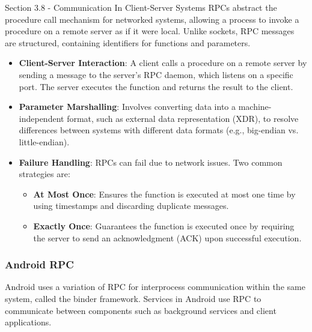 \begin{notes}{Section 3.8 - Communication In Client-Server Systems}
    RPCs abstract the procedure call mechanism for networked systems, allowing a process to invoke a procedure on a remote server as if it were local. Unlike sockets, RPC messages are structured, 
    containing identifiers for functions and parameters.
    
    \begin{highlight}
    
        \begin{itemize}
            \item \textbf{Client-Server Interaction}: A client calls a procedure on a remote server by sending a message to the server's RPC daemon, which listens on a specific port. The server executes 
            the function and returns the result to the client.
            \item \textbf{Parameter Marshalling}: Involves converting data into a machine-independent format, such as external data representation (XDR), to resolve differences between systems with 
            different data formats (e.g., big-endian vs. little-endian).
            \item \textbf{Failure Handling}: RPCs can fail due to network issues. Two common strategies are:
                \begin{itemize}
                    \item \textbf{At Most Once}: Ensures the function is executed at most one time by using timestamps and discarding duplicate messages.
                    \item \textbf{Exactly Once}: Guarantees the function is executed once by requiring the server to send an acknowledgment (ACK) upon successful execution.
                \end{itemize}
        \end{itemize}
    
    \end{highlight}
    
    \subsubsection*{Android RPC}
    
    Android uses a variation of RPC for interprocess communication within the same system, called the binder framework. Services in Android use RPC to communicate between components such as background 
    services and client applications.
    
    \begin{highlight}
    

\end{highlight}
\end{notes}
